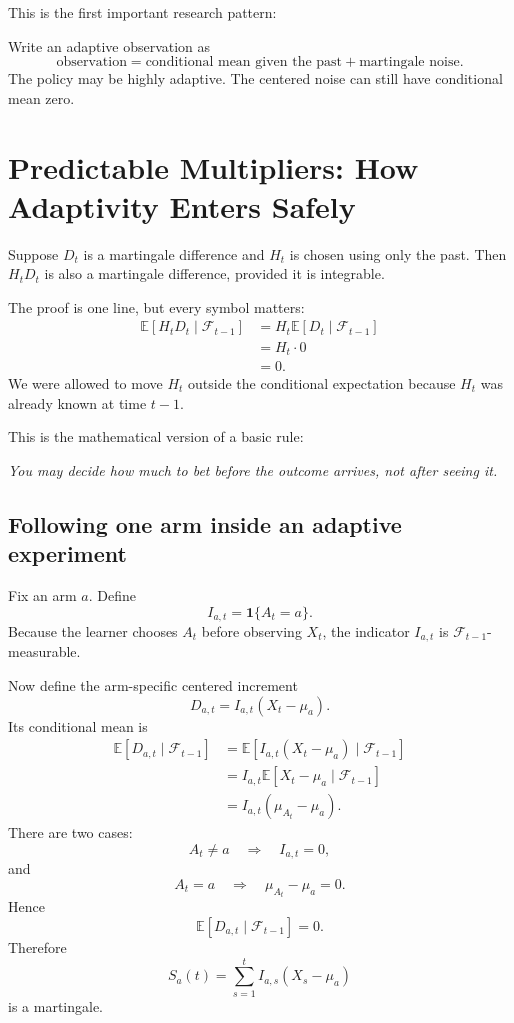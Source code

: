 \documentclass[en,nofont,11pt]{elegantbook}
\newcommand{\E}{\mathbb{E}}
\newcommand{\one}{\mathbf{1}}
\newcommand{\F}{\mathcal{F}}
\begin{document}
This is the first important research pattern:

\begin{patternbox}
Write an adaptive observation as
\[
\text{observation}
=
\text{conditional mean given the past}
+
\text{martingale noise}.
\]
The policy may be highly adaptive. The centered noise can still have conditional mean zero.
\end{patternbox}

\chapter{Predictable Multipliers: How Adaptivity Enters Safely}

Suppose $D_t$ is a martingale difference and $H_t$ is chosen using only the past. Then $H_tD_t$ is also a martingale difference, provided it is integrable.

The proof is one line, but every symbol matters:
\begin{align*}
\E[H_tD_t\mid\F_{t-1}]
&=H_t\E[D_t\mid\F_{t-1}]\\
&=H_t\cdot 0\\
&=0.
\end{align*}
We were allowed to move $H_t$ outside the conditional expectation because $H_t$ was already known at time $t-1$.

This is the mathematical version of a basic rule:

\begin{center}
\emph{You may decide how much to bet before the outcome arrives, not after seeing it.}
\end{center}

\section{Following one arm inside an adaptive experiment}

Fix an arm $a$. Define
\[
I_{a,t}=\one\{A_t=a\}.
\]
Because the learner chooses $A_t$ before observing $X_t$, the indicator $I_{a,t}$ is $\F_{t-1}$-measurable.

Now define the arm-specific centered increment
\[
D_{a,t}=I_{a,t}(X_t-\mu_a).
\]
Its conditional mean is
\begin{align*}
\E[D_{a,t}\mid\F_{t-1}]
&=\E[I_{a,t}(X_t-\mu_a)\mid\F_{t-1}]\\
&=I_{a,t}\E[X_t-\mu_a\mid\F_{t-1}]\\
&=I_{a,t}(\mu_{A_t}-\mu_a).
\end{align*}
There are two cases:
\[
A_t\neq a
\quad\Longrightarrow\quad
I_{a,t}=0,
\]
and
\[
A_t=a
\quad\Longrightarrow\quad
\mu_{A_t}-\mu_a=0.
\]
Hence
\[
\E[D_{a,t}\mid\F_{t-1}]=0.
\]
Therefore
\[
S_a(t)=\sum_{s=1}^{t}I_{a,s}(X_s-\mu_a)
\]
is a martingale.
\end{document}
